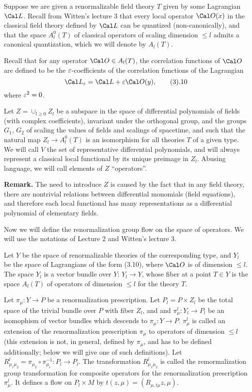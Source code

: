 Suppose we are given a renormalizable field theory $T$ 
given by some Lagrangian 
$\Cal L$.  
Recall from Witten's lecture 3 that every local operator $\O(x)$ in the 
classical field theory defined by $\Cal L$ can be quantized (non-canonically), 
and that the space $A_l^0(T)$ of classical operators of 
scaling dimension $\le l$ admits a canonical quantization,
which we will denote by $A_l(T)$. 

Recall that for
 any operator $\O\in A_l(T)$, the correlation functions of $\Cal O$
are defined to be the $\varepsilon$-coefficients of the correlation functions
of the Lagrangian
$$
\Cal L_\e=\Cal L+\e\O(y),\tag 3.10
$$
where $\varepsilon^2=0$. 

Let $Z=\cup_{l\ge 0}Z_l$ be a subspace in the space of differential 
polynomials of fields (with complex coefficients), 
invariant under the orthogonal group, 
and the groups $G_1$, $G_2$ of scaling the values of
fields and scalings of spacetime, and such 
that the natural map $Z_l\to A_l^0(T)$ is an isomorphism 
for all theories $T$ of a given type. 
We will call $V$ the set of representative differential 
polynomials, and will always represent a classical local functional 
by its unique preimage in $Z_l$. Abusing language, we will call elements of 
$Z$ ``operators''. 

{\bf Remark.} The need to introduce $Z$ is caused by the fact that in any
field theory, there are nontrivial relations between differential monomials
(field equations), and therefore each local functional has many
representations as a differential polynomial of elementary fields. 

Now we will define the renormalization group flow on the space of operators. 
We will use the notations of Lecture 2 and Witten's lecture 3. 

Let $Y$ be the space of renormalizable theories of the corresponding type, 
and $Y_l$ be the space of Lagrangians of the form 
(3.10), where $\O$ is of dimension $\le l$. The space $Y_l$ is 
a vector bundle over $Y$: $Y_l\to Y$, whose fiber at a point $T\in Y$
is the space $A_l(T)$ of operators of dimension $\le l$
for the theory $T$. 

Let $\pi_\mu: Y\to P$ be a renormalization prescription. 
Let  
$P_l=P\times Z_l$ be the total space of the trivial bundle
over $P$ with fiber $Z_l$, and 
and $\pi_\mu^l: Y_l\to P_l$ 
be an isomophism of vector bundles which descends to $\pi_\mu:Y\to P$. 
$\pi_\mu^l$ is called an extension of the renormalization prescription
$\pi_\mu$ to operators of dimension $\le l$ (this extension is 
not, in general, 
defined by $\pi_\mu$, and has to be defined additionally;
below we will give one of such definitions).
Let $R_{\mu_1\mu_2}^l=\pi_{\mu_2}\circ \pi_{\mu_1}^{-1}: P_l\to P_l$.
The transformation $R_{\mu_1\mu_2}^l$ is called the remormalization 
group transformation for composite operators
for the renormalization prescription $\pi_\mu^l$. It defines a flow
on $P_l\times M$ by $t(z,\mu)=
(R_{\mu,t\mu}z,\mu)$. 

